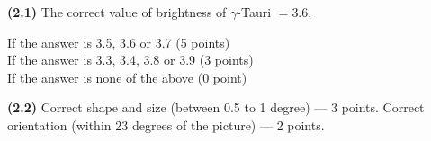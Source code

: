 \textbf{(2.1)} The correct value of brightness of $\gamma$-Tauri $= 3.6$.

If the answer is 3.5, 3.6 or 3.7 \hfill(5 points)\\
If the answer is 3.3, 3.4, 3.8 or 3.9 \hfill(3 points)\\
If the answer is none of the above \hfill(0 point)

\textbf{(2.2)} Correct shape and size (between 0.5 to 1 degree) --- 3
points. Correct orientation (within 23 degrees of the picture) --- 2
points.

